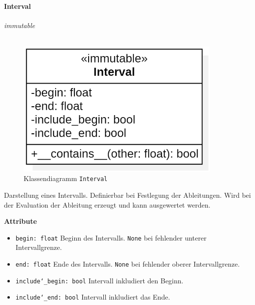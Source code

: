\documentclass{article}
\begin{document}
\newpage
\textbf{\large{Interval}}\\\\
\textit{\flqq{}immutable\frqq}\normalsize\\\\
\begin{figure}[H]%
    \centering
    \includegraphics[width=10cm]{entwurf/Entwurf_dokument/img/cls/model/Interval.png}
    \caption{Klassendiagramm \texttt{Interval}}
\end{figure}

Darstellung eines Intervalls. Definierbar bei Festlegung der Ableitungen. Wird bei der Evaluation der Ableitung erzeugt und kann ausgewertet werden.
\newline \newline

\textbf{{Attribute}}
\begin{itemize}
\item \texttt{begin: float} \newline Beginn des Intervalls. \texttt{None} bei fehlender unterer Intervallgrenze. 
\item \texttt{end: float} \newline Ende des Intervalls. \texttt{None} bei fehlender oberer Intervallgrenze. 
\item \texttt{include\char`_begin: bool} \newline Intervall inkludiert den Beginn.
\item \texttt{include\char`_end: bool} \newline Intervall inkludiert das Ende.
\\\\
\end{itemize}
\end{document}
